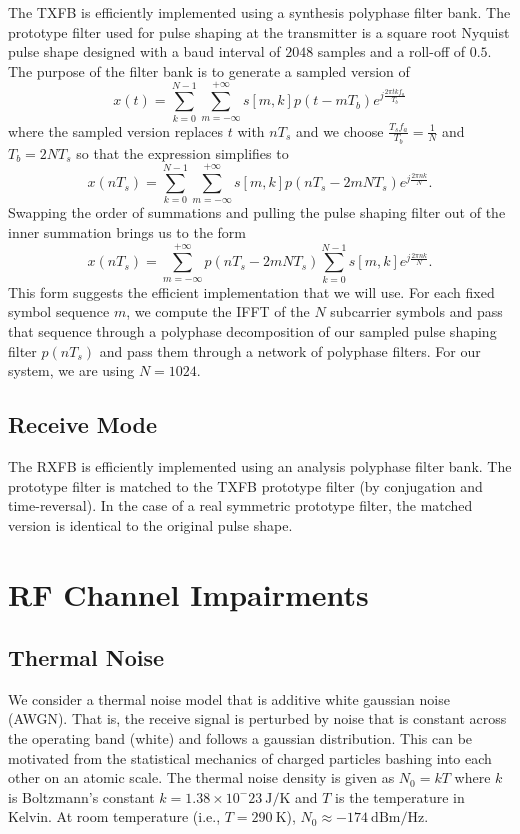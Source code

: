 \documentclass[conference]{IEEEtran}
\begin{document}
The TXFB is efficiently implemented using a synthesis polyphase filter bank.
The prototype filter used for pulse shaping at the transmitter is a square root
Nyquist pulse shape designed with a baud interval of $2048$ samples and a
roll-off of $0.5$. The purpose of the filter bank is to generate a sampled version of
\begin{equation}
x(t) = \sum_{k=0}^{N-1} \sum_{m=-\infty}^{+\infty} s[m, k] p(t - m T_b) e^{j \frac{2 \pi t k f_a}{T_b}}
\end{equation}
where the sampled version replaces $t$ with $n T_s$ and we choose $\frac{T_s f_a}{T_b} = \frac{1}{N}$
and $T_b = 2 N T_s$ so that the expression simplifies to
\begin{equation}
x(n T_s) = \sum_{k=0}^{N-1} \sum_{m=-\infty}^{+\infty} s[m, k] p(n T_s - 2 m N T_s) e^{j \frac{2 \pi n k}{N}}.
\end{equation}
Swapping the order of summations and pulling the pulse shaping filter out of the inner summation
brings us to the form
\begin{equation}
x(n T_s) = \sum_{m=-\infty}^{+\infty} p(n T_s - 2 m N T_s) \sum_{k=0}^{N-1} s[m, k] e^{j \frac{2 \pi n k}{N}}.
\end{equation}
This form suggests the efficient implementation that we will use. For each fixed symbol sequence $m$,
we compute the IFFT of the $N$ subcarrier symbols and pass that sequence through a polyphase decomposition
of our sampled pulse shaping filter $p(n T_s)$ and pass them through a network of polyphase filters. For
our system, we are using $N=1024$.

\subsection*{Receive Mode}

The RXFB is efficiently implemented using an analysis polyphase filter bank.
The prototype filter is matched to the TXFB prototype filter (by conjugation and
time-reversal). In the case of a real symmetric prototype filter, the matched
version is identical to the original pulse shape.

\section{RF Channel Impairments}
\label{sec:chan}

\subsection*{Thermal Noise}
We consider a thermal noise model that is additive white gaussian noise (AWGN).
That is, the receive signal is perturbed by noise that is constant across the
operating band (white) and follows a gaussian distribution. This can be motivated
from the statistical mechanics of charged particles bashing into each other on an
atomic scale. The thermal noise density is given as $N_0 = k T$ where $k$ is
Boltzmann's constant $k = 1.38 \times 10^-23\:\mbox{J/K}$ and $T$ is the
temperature in Kelvin. At room temperature (i.e., $T = 290\:\mbox{K}$),
$N_0 \approx -174\:\mbox{dBm/Hz}$.
\end{document}
